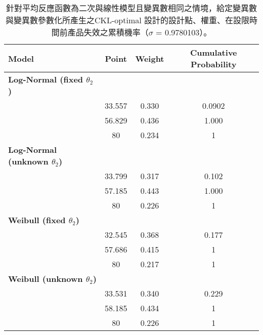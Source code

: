 \begin{table}[H] \scriptsize
\caption{針對平均反應函數為二次與線性模型且變異數相同之情境，給定變異數與變異數參數化所產生之CKL-optimal 設計的設計點、權重、在設限時間前產品失效之累積機率（$\sigma$ = 0.9780103）。}
\label{tab:design_comparison0.98}
\centering
\renewcommand{\arraystretch}{1.3}
\begin{tabular}{lccc}
\toprule
\textbf{Model} & \textbf{Point} & \textbf{Weight} & \textbf{Cumulative Probability} \\
\midrule
\textbf{Log-Normal (fixed $\theta_2$)} & & & \\
\quad & 33.557 & 0.330 & 0.0902 \\
\quad & 56.829 & 0.436 & 1.000 \\
\quad & 80 & 0.234 & 1\\
\addlinespace
\textbf{Log-Normal (unknown $\theta_2$)} & & & \\
\quad & 33.799 & 0.317 & 0.102 \\
\quad & 57.185 & 0.443 & 1.000 \\
\quad & 80 & 0.226 & 1 \\
\addlinespace
\textbf{Weibull (fixed $\theta_2$)} & & & \\
\quad & 32.545 & 0.368 & 0.177 \\
\quad & 57.686 & 0.415 & 1 \\
\quad & 80 & 0.217 & 1 \\
\addlinespace
\textbf{Weibull (unknown $\theta_2$)} & & & \\
\quad & 33.531 & 0.340 & 0.229 \\
\quad & 58.185 & 0.434 & 1 \\
\quad & 80 & 0.226 & 1 \\
\bottomrule
\end{tabular}
\end{table}

